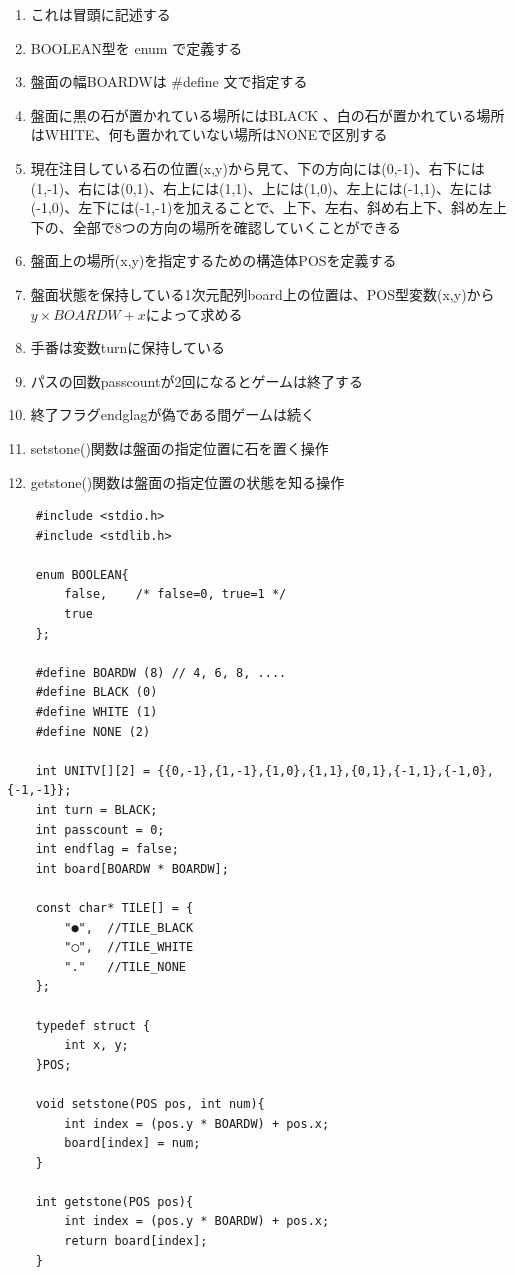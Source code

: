 \documentclass[uplatex,a4paper,11pt,oneside,openany]{jsbook}
\begin{document}
\begin{enumerate}
	\item これは冒頭に記述する
	\item BOOLEAN型を enum で定義する
	\item 盤面の幅BOARDWは \#define 文で指定する
	\item 盤面に黒の石が置かれている場所にはBLACK 、白の石が置かれている場所はWHITE、何も置かれていない場所はNONEで区別する
	\item 現在注目している石の位置(x,y)から見て、下の方向には(0,-1)、右下には(1,-1)、右には(0,1)、右上には(1,1)、上には(1,0)、左上には(-1,1)、左には(-1,0)、左下には(-1,-1)を加えることで、上下、左右、斜め右上下、斜め左上下の、全部で8つの方向の場所を確認していくことができる
	\item 盤面上の場所(x,y)を指定するための構造体POSを定義する
	\item 盤面状態を保持している1次元配列board上の位置は、POS型変数(x,y)から\\$y \times BOARDW +x$によって求める
	\item 手番は変数turnに保持している
	\item パスの回数passcountが2回になるとゲームは終了する
	\item 終了フラグendglagが偽である間ゲームは続く
	\item setstone()関数は盤面の指定位置に石を置く操作
	\item getstone()関数は盤面の指定位置の状態を知る操作
\end{enumerate}

\begin{lstlisting}
	#include <stdio.h>
	#include <stdlib.h>
	
	enum BOOLEAN{
		false,    /* false=0, true=1 */
		true
	};
	
	#define BOARDW (8) // 4, 6, 8, ....
	#define BLACK (0)
	#define WHITE (1)
	#define NONE (2)
	
	int UNITV[][2] = {{0,-1},{1,-1},{1,0},{1,1},{0,1},{-1,1},{-1,0},{-1,-1}};
	int turn = BLACK;
	int passcount = 0;
	int endflag = false;
	int board[BOARDW * BOARDW];
	
	const char* TILE[] = {
		"●",  //TILE_BLACK
		"◯",  //TILE_WHITE
		"."   //TILE_NONE
	};
	
	typedef struct {
		int x, y;
	}POS;
	
	void setstone(POS pos, int num){
		int index = (pos.y * BOARDW) + pos.x;
		board[index] = num;
	}
	
	int getstone(POS pos){
		int index = (pos.y * BOARDW) + pos.x;
		return board[index];
	}
\end{lstlisting}
\end{document}
